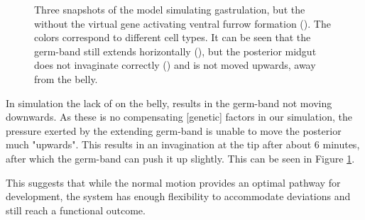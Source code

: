 \begin{figure}[H]
    \centering

    \caption{Three snapshots of the model simulating gastrulation, but the without the virtual gene activating ventral furrow formation (). The colors correspond to different cell types. It can be seen that the germ-band still extends horizontally (), but the posterior midgut does not invaginate correctly () and is not moved upwards, away from the belly.}
    \label{fig:VFmutant}
\end{figure}


In simulation the lack of  on the belly, results in the germ-band not moving downwards. As these is no compensating [genetic] factors in our simulation, the pressure exerted by the extending germ-band  is unable to move the posterior much "upwards". This results in an invagination at the tip after about 6 minutes, after which the germ-band can push it up slightly. This can be seen in Figure \ref{fig:VFmutant}.\\


This suggests that while the normal motion provides an optimal pathway for development, the system has enough flexibility to accommodate deviations and still reach a functional outcome.



